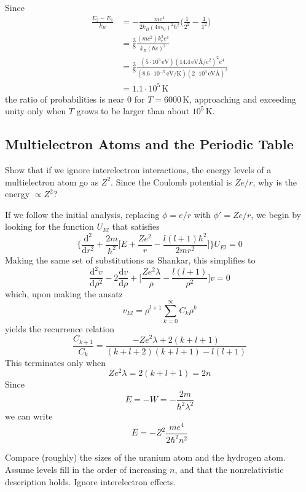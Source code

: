 \documentclass[../principles-of-quantum-mechanics.tex]{subfiles}
\begin{document}
\begin{questions}
	\begin{solution}
		Since
		\begin{align*}
			\frac{E_2 - E_1}{k_B} &= -\frac{me^4}{2k_B(4\pi\epsilon_0)^2\hbar^2}\Big(\frac{1}{2^2} - \frac{1}{1^2}\Big) \\
			&= \frac{3}{8}\frac{(mc^2)k_e^2e^4}{k_B(\hbar c)^2} \\
			&= \frac{3}{8}\frac{(5\cdot10^5\,\text{eV})(14.4\,\text{eV\AA}/e^2)^2e^4}{(8.6\cdot10^{-5}\,\text{eV/K})(2\cdot10^3\,\text{eV\AA})^2} \\
			&= 1.1\cdot10^5\,\text{K}
		\end{align*}
		the ratio of probabilities is near $0$ for $T = 6000\,\text{K}$, approaching and exceeding unity only when $T$ grows to be larger than about $10^5\,\text{K}$.
	\end{solution}

	\setcounter{subsection}{3}
	\subsection{Multielectron Atoms and the Periodic Table}
	\setcounter{question}{0}
	
	\question Show that if we ignore interelectron interactions, the energy levels of a multielectron atom go as $Z^2$. Since the Coulomb potential is $Ze/r$, why is the energy $\propto Z^2$?
	
	\begin{solution}
		If we follow the initial analysis, replacing $\phi = e/r$ with $\phi' = Ze/r$, we begin by looking for the function $U_{El}$ that satisfies
		$$\Big\{\frac{\mathrm{d}^2}{\mathrm{d}r^2} + \frac{2m}{\hbar^2}\Big[E + \frac{Ze^2}{r} - \frac{l(l + 1)\hbar^2}{2mr^2}\Big]\Big\}U_{El} = 0$$
		Making the same set of substitutions as Shankar, this simplifies to
		$$\frac{\mathrm{d}^2v}{\mathrm{d}\rho^2} - 2\frac{\mathrm{d}v}{\mathrm{d}\rho} + \Big[\frac{Ze^2\lambda}{\rho} - \frac{l(l + 1)}{\rho^2}\Big]v = 0$$
		which, upon making the ansatz
		$$v_{El} = \rho^{l + 1}\sum_{k=0}^{\infty}C_k\rho^k$$
		yields the recurrence relation
		$$\frac{C_{k+1}}{C_k} = \frac{-Ze^2\lambda+ 2(k + l + 1)}{(k + l + 2)(k + l + 1) - l(l + 1)}$$
		This terminates only when
		$$Ze^2\lambda = 2(k + l + 1) = 2n$$
		Since
		$$E = -W = -\frac{2m}{\hbar^2\lambda^2}$$
		we can write
		$$E = -Z^2\frac{me^4}{2\hbar^2n^2}$$
	\end{solution}
	
	\question Compare (roughly) the sizes of the uranium atom and the hydrogen atom. Assume levels fill in the order of increasing $n$, and that the nonrelativistic description holds. Ignore interelectron effects.
	

\end{questions}
\end{document}
